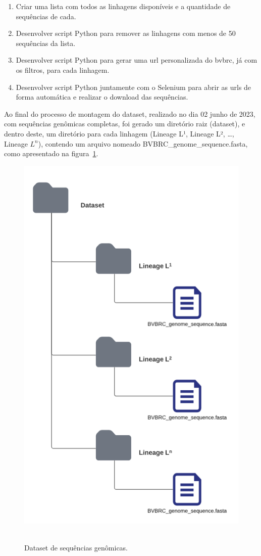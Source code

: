 \begin{enumerate}
  \item Criar uma lista com todos as linhagens disponíveis e a quantidade de sequências de cada.
  \item Desenvolver script Python para remover as linhagens com menos de 50 sequências da lista.
  \item Desenvolver script Python para gerar uma url personalizada do \gls{bvbrc}, já com os filtros, para cada linhagem.
  \item Desenvolver script Python juntamente com o Selenium para abrir as urls de forma automática e realizar o download das sequências.
\end{enumerate}

Ao final do processo de montagem do dataset, realizado no dia 02 junho de 2023, com sequências genômicas completas, foi gerado um diretório raiz (dataset), e dentro deste, um diretório para cada linhagem (Lineage L¹, Lineage L², \dots, Lineage $L^{n}$), contendo um arquivo nomeado \textnormal{BVBRC\_genome\_sequence.fasta}, como apresentado na figura~\ref{fig:datasetGenomas}.

\begin{figure}[htb]
  \centering
  \caption{Dataset de sequências genômicas.}
  \includegraphics[scale=0.5]{figuras/dataset_principal.png}
  ~\label{fig:datasetGenomas}
\end{figure}

